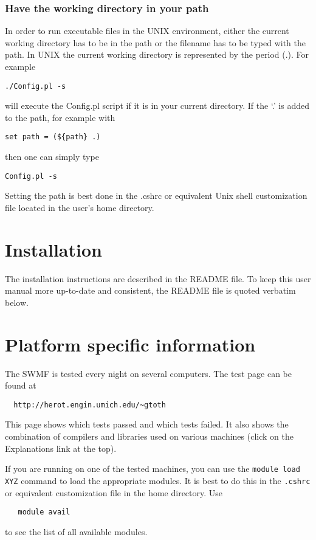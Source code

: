 \subsubsection{Have the working directory in your path}

In order to run executable files in the UNIX environment, either
the current working directory has to be in the path or the filename has
to be typed with the path.
In UNIX the current working directory is represented
by the period (.).  For example
\begin{verbatim} 
./Config.pl -s
\end{verbatim}
will execute the Config.pl script if it is in your current directory.  
If the `.' is added to the path, for example with
\begin{verbatim}
set path = (${path} .)
\end{verbatim}
then one can simply type
\begin{verbatim} 
Config.pl -s
\end{verbatim}
Setting the path is best done in the .cshrc or equivalent Unix shell 
customization file located in the user's home directory.

\section{Installation}

The installation instructions are described in the README file.
To keep this user manual more up-to-date and consistent, 
the README file is quoted verbatim below.


\section{Platform specific information}

The SWMF is tested every night on several computers.
The test page can be found at
\begin{verbatim}
  http://herot.engin.umich.edu/~gtoth
\end{verbatim}
This page shows which tests passed and which tests failed.
It also shows the combination of compilers and libraries
used on various machines (click on the Explanations link at the top).

If you are running on one of the tested machines, 
you can use the {\tt module load XYZ} command to load 
the appropriate modules. It is best to do this in the {\tt .cshrc} or equivalent 
customization file in the home directory. Use
\begin{verbatim}
   module avail
\end{verbatim}
to see the list of all available modules.

